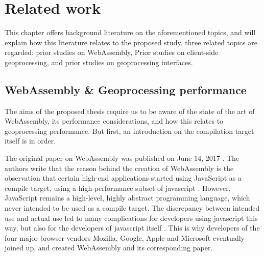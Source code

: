 %
% 
% 

\newpage

\section{Related work}

This chapter offers background literature on the aforementioned topics, and will explain how this literature relates to the proposed study. three related topics are regarded: prior studies on WebAssembly, Prior studies on client-side geoprocessing, and prior studies on geoprocessing interfaces.



\subsection{WebAssembly \& Geoprocessing performance}

The aims of the proposed thesis require us to be aware of the state of the art of WebAssembly, its performance considerations, and how this relates to geoprocessing performance. But first, an introduction on the compilation target itself is in order.

The original paper on WebAssembly was published on June 14, 2017 \cite{haas_bringing_2017}. The authors write that the reason behind the creation of WebAssembly is the observation that certain high-end applications started using JavaScript as a compile target, using a high-performance subset of javascript \cite{mozilla_asmjs_2013}. However, JavaScript remains a high-level, highly abstract programming language, which never intended to be used as a compile target. The discrepancy between intended use and actual use led to many complications for developers using javascript this way, but also for the developers of javascript itself \cite{haas_bringing_2017}. This is why developers of the four major browser vendors Mozilla, Google, Apple and Microsoft eventually joined up, and created WebAssembly and its corresponding paper. %

